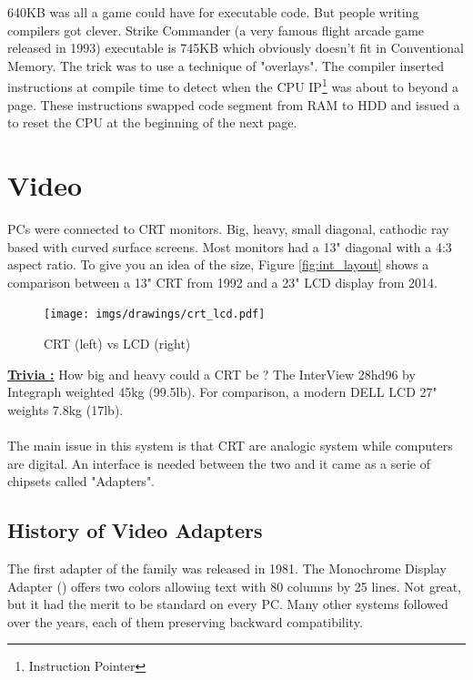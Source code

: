 \documentclass[book.tex]{subfiles}
\begin{document}
\par
{} 640KB was all a game could have for executable code. But people writing compilers got clever. Strike Commander (a very famous flight arcade game released in 1993) executable is 745KB which obviously doesn't fit in Conventional Memory. The trick was to use a technique of "overlays". The compiler inserted instructions at compile time to detect when the CPU IP\footnote{Instruction Pointer} was about to beyond a page. These instructions swapped code segment from RAM to HDD and issued a  to reset the CPU at the beginning of the next page.

















\section{Video}

PCs were connected to CRT monitors. Big, heavy, small diagonal, cathodic ray based with curved surface screens. Most monitors had a 13" diagonal with a 4:3 aspect ratio. To give you an idea of the size, Figure \ref{fig:int_layout} shows a comparison between a 13" CRT from 1992 and a 23" LCD display from 2014.\\

\begin{figure}[H]
\centering
\texttt{[image: imgs/drawings/crt\_lcd.pdf]}
\caption{CRT (left) vs LCD (right)}
\label{fig:lcd_vs_crt}
\end{figure}

\textbf{\underline{Trivia :}} How big and heavy could a CRT be ? The InterView 28hd96 by Integraph weighted 45kg (99.5lb). For comparison, a modern DELL LCD 27" weights 7.8kg (17lb).\\
\\
The main issue in this system is that CRT are analogic system while computers are digital. An interface is needed between the two and it came as a serie of chipsets called "Adapters". 

  \subsection{History of Video Adapters}

The first adapter of the family was released in 1981. The Monochrome Display
   Adapter () offers two colors allowing text with 80 columns by 25 lines.  Not great, but it had the merit to be standard on every PC. Many other systems followed over the years, each of them preserving backward compatibility.
\bigskip
  
\end{document}
